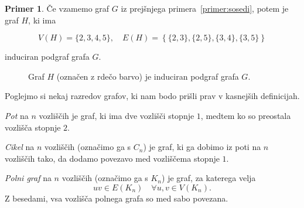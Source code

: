 \documentclass[12pt,a4paper]{amsart}
\theoremstyle{definition} %
\newtheorem{primer}[definicija]{Primer}
\theoremstyle{plain} %
\newcommand{\vozlisca}[1][G]{\ensuremath{V(#1)}}
\newcommand{\povezave}[1][G]{\ensuremath{E(#1)}}
\begin{document}
\begin{primer}
    Če vzamemo graf $G$ iz prejšnjega primera~\ref{primer:sosedi}, potem je graf $H$, ki ima
    
    \[ \vozlisca[H] = \{2,3,4,5\},\quad \povezave[H] = \left\{ \{2,3\},\{2,5\},\{3,4\},\{3,5\} \right\} \]
    
    induciran podgraf grafa $G$.
    
    \begin{figure}[h]
        \caption{Graf $H$ (označen z rdečo barvo) je induciran podgraf grafa $G$.}
    \end{figure}
\end{primer}

Poglejmo si nekaj razredov grafov, ki nam bodo prišli prav v kasnejših definicijah. 

\emph{Pot} na $n$ vozliščih je graf, ki ima dve vozlišči stopnje $1$, medtem ko so preostala vozlišča stopnje $2$.

\emph{Cikel} na $n$ vozliščih (označimo ga s $C_n$) je graf, ki ga dobimo iz poti na $n$ vozliščih tako, da dodamo povezavo med vozliščema stopnje $1$.

\emph{Polni graf} na $n$ vozliščih (označimo ga s $K_n$) je graf, za katerega velja 
\[ uv \in \povezave[K_n] \quad \forall u,v \in \vozlisca[K_n].\] 
Z besedami, vsa vozlišča polnega grafa so med sabo povezana.
\end{document}
